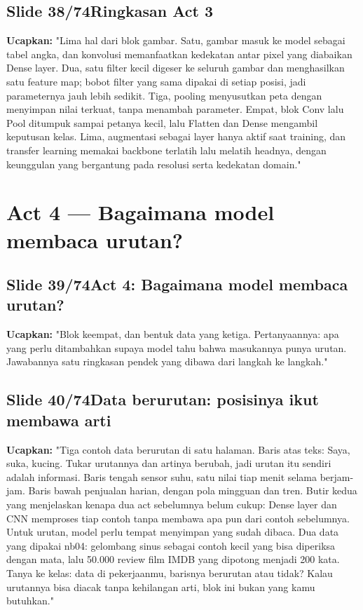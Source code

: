 \documentclass[11pt]{article}
\renewcommand{\framebox}[1]{\colorbox{acc!15}{\textcolor{acc}{\textbf{#1}}}}
\begin{document}
\subsection*{\framebox{Slide 38/74}\quad Ringkasan Act 3}
\textbf{Ucapkan:} "Lima hal dari blok gambar. Satu, gambar masuk ke model sebagai tabel angka, dan konvolusi memanfaatkan kedekatan antar pixel yang diabaikan Dense layer. Dua, satu filter kecil digeser ke seluruh gambar dan menghasilkan satu feature map; bobot filter yang sama dipakai di setiap posisi, jadi parameternya jauh lebih sedikit. Tiga, pooling menyusutkan peta dengan menyimpan nilai terkuat, tanpa menambah parameter. Empat, blok Conv lalu Pool ditumpuk sampai petanya kecil, lalu Flatten dan Dense mengambil keputusan kelas. Lima, augmentasi sebagai layer hanya aktif saat training, dan transfer learning memakai backbone terlatih lalu melatih headnya, dengan keunggulan yang bergantung pada resolusi serta kedekatan domain."\\[2pt]

\section{Act 4 — Bagaimana model membaca urutan?}

\subsection*{\framebox{Slide 39/74}\quad Act 4: Bagaimana model membaca urutan?}
\textbf{Ucapkan:} "Blok keempat, dan bentuk data yang ketiga. Pertanyaannya: apa yang perlu ditambahkan supaya model tahu bahwa masukannya punya urutan. Jawabannya satu ringkasan pendek yang dibawa dari langkah ke langkah."\\[2pt]

\subsection*{\framebox{Slide 40/74}\quad Data berurutan: posisinya ikut membawa arti}
\textbf{Ucapkan:} "Tiga contoh data berurutan di satu halaman. Baris atas teks: Saya, suka, kucing. Tukar urutannya dan artinya berubah, jadi urutan itu sendiri adalah informasi. Baris tengah sensor suhu, satu nilai tiap menit selama berjam-jam. Baris bawah penjualan harian, dengan pola mingguan dan tren. Butir kedua yang menjelaskan kenapa dua act sebelumnya belum cukup: Dense layer dan CNN memproses tiap contoh tanpa membawa apa pun dari contoh sebelumnya. Untuk urutan, model perlu tempat menyimpan yang sudah dibaca. Dua data yang dipakai nb04: gelombang sinus sebagai contoh kecil yang bisa diperiksa dengan mata, lalu 50.000 review film IMDB yang dipotong menjadi 200 kata. Tanya ke kelas: data di pekerjaanmu, barisnya berurutan atau tidak? Kalau urutannya bisa diacak tanpa kehilangan arti, blok ini bukan yang kamu butuhkan."\\[2pt]
\end{document}

